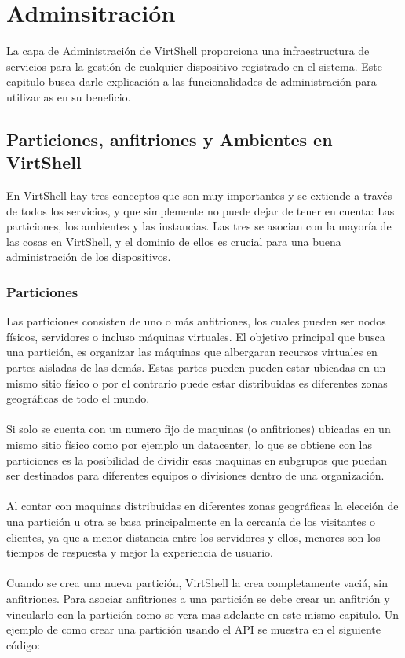 \chapter{Adminsitración}
\label{capadministracion}

La capa de Administración de VirtShell proporciona una infraestructura de servicios para la gestión de cualquier dispositivo registrado en el sistema. Este capitulo busca darle explicación a las funcionalidades de administración para utilizarlas en su beneficio.

\section{Particiones, anfitriones y Ambientes en VirtShell}
En VirtShell hay tres conceptos que son muy importantes y se extiende a través de todos los servicios, y que simplemente no puede dejar de tener en cuenta: Las particiones, los ambientes y las instancias. Las tres se asocian con la mayoría de las cosas en VirtShell, y el dominio de ellos es crucial para una buena administración de los dispositivos. 

\subsection{Particiones}
Las particiones consisten de uno o más anfitriones, los cuales pueden ser nodos físicos, servidores o incluso máquinas virtuales. El objetivo principal que busca una partición, es organizar las máquinas que albergaran recursos virtuales en partes aisladas de las demás. Estas partes pueden pueden estar ubicadas en un mismo sitio físico o por el contrario puede estar distribuidas es diferentes zonas geográficas de todo el mundo.\\
\\
Si solo se cuenta con un numero fijo de maquinas (o anfitriones) ubicadas en un mismo sitio físico como por ejemplo un datacenter, lo que se obtiene con las particiones es la posibilidad de dividir esas maquinas en subgrupos que puedan ser destinados para diferentes equipos o divisiones dentro de una organización.\\ 
\\
Al contar con maquinas distribuidas en diferentes zonas geográficas la elección de una partición u otra se basa principalmente en la cercanía de los visitantes o clientes, ya que a menor distancia entre los servidores y ellos, menores son los tiempos de respuesta y mejor la experiencia de usuario.\\
\\
Cuando se crea una nueva partición, VirtShell la crea completamente vaciá, sin anfitriones. Para asociar anfitriones a una partición se debe crear un anfitrión y vincularlo con la partición como se vera mas adelante en este mismo capitulo. Un ejemplo de como crear una partición usando el API se muestra en el siguiente código:

